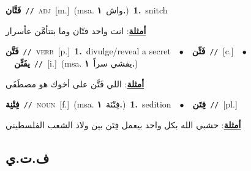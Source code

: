 \documentclass[10pt,a4paper,twoside]{article} %
\begin{document}
\begin{multicols}{2}
{\setlength\topsep{0pt}\textbf{\foreignlanguage{arabic}{فَتَّان}}\ {\color{gray}\texttt{//}\color{black}}\ \textsc{adj}\ [m.]\ \color{gray}(msa. \foreignlanguage{arabic}{واش}~\foreignlanguage{arabic}{\textbf{١.}})\color{black}\ \textbf{1.}~snitch\  \begin{flushright}\color{gray}\foreignlanguage{arabic}{\textbf{\underline{\foreignlanguage{arabic}{أمثلة}}}: انت واحد فتّان وما بتتأمَّن عأسرار}\end{flushright}\color{black}} \vspace{2mm}

{\setlength\topsep{0pt}\textbf{\foreignlanguage{arabic}{فَتَّن}}\ {\color{gray}\texttt{//}\color{black}}\ \textsc{verb}\ [p.]\ \textbf{1.}~divulge/reveal a secret\ \ $\bullet$\ \ \setlength\topsep{0pt}\textbf{\foreignlanguage{arabic}{فَتِّن}}\ {\color{gray}\texttt{//}\color{black}}\ [c.]\ \ $\bullet$\ \ \setlength\topsep{0pt}\textbf{\foreignlanguage{arabic}{يفَتِّن}}\ {\color{gray}\texttt{//}\color{black}}\ [i.]\ \color{gray}(msa. \foreignlanguage{arabic}{يفشي سراً}~\foreignlanguage{arabic}{\textbf{١.}})\color{black}\  \begin{flushright}\color{gray}\foreignlanguage{arabic}{\textbf{\underline{\foreignlanguage{arabic}{أمثلة}}}: اللي فَتَّن على أخوك هو مصطَفَى}\end{flushright}\color{black}} \vspace{2mm}

{\setlength\topsep{0pt}\textbf{\foreignlanguage{arabic}{فِتْنِة}}\ {\color{gray}\texttt{//}\color{black}}\ \textsc{noun}\ [f.]\ \color{gray}(msa. \foreignlanguage{arabic}{فِتْنَة}~\foreignlanguage{arabic}{\textbf{١.}})\color{black}\ \textbf{1.}~sedition\ \ $\bullet$\ \ \setlength\topsep{0pt}\textbf{\foreignlanguage{arabic}{فِتَن}}\ {\color{gray}\texttt{//}\color{black}}\ [pl.]\  \begin{flushright}\color{gray}\foreignlanguage{arabic}{\textbf{\underline{\foreignlanguage{arabic}{أمثلة}}}: حشبي الله بكل واحد بيعمل فِتَن بين ولاد الشعب الفلسطيني}\end{flushright}\color{black}} \vspace{2mm}

\vspace{-3mm}
\subsection*{\color{blue}\foreignlanguage{arabic}{ف.ت.ي}\color{blue}{}} 


\end{multicols}
\end{document}
